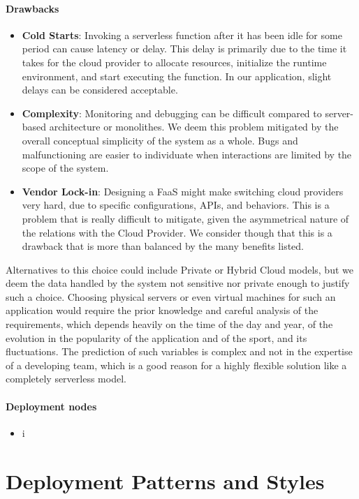 \documentclass{article}
\begin{document}
\paragraph*{Drawbacks}%
\begin{itemize}
    \item \textbf{Cold Starts}: Invoking a serverless function after it has been idle for some period can cause latency or delay. This delay is primarily due to the time it takes for the cloud provider to allocate resources, initialize the runtime environment, and start executing the function. In our application, slight delays can be considered acceptable.
    \item \textbf{Complexity}: Monitoring and debugging can be difficult compared to server-based architecture or monolithes. We deem this problem mitigated by the overall conceptual simplicity of the system as a whole. Bugs and malfunctioning are easier to individuate when interactions are limited by the scope of the system.
    \item \textbf{Vendor Lock-in}: Designing a FaaS might make switching cloud providers very hard, due to specific configurations, APIs, and behaviors. This is a problem that is really difficult to mitigate, given the asymmetrical nature of the relations with the Cloud Provider. We consider though that this is a drawback that is more than balanced by the many benefits listed.
\end{itemize}

Alternatives to this choice could include Private or Hybrid Cloud models, but we deem the data handled by the system not sensitive nor private enough to justify such a choice. 
Choosing physical servers or even virtual machines for such an application would require the prior knowledge and careful analysis of the requirements, which depends heavily on the time of the day and year, of the evolution in the popularity of the application and of the sport, and its fluctuations. The prediction of such variables is complex and not in the expertise of a developing team, which is a good reason for a highly flexible solution like a completely serverless model.

\paragraph{Deployment nodes}
\begin{itemize}
    \item i
\end{itemize}
\section{Deployment Patterns and Styles}
\end{document}
